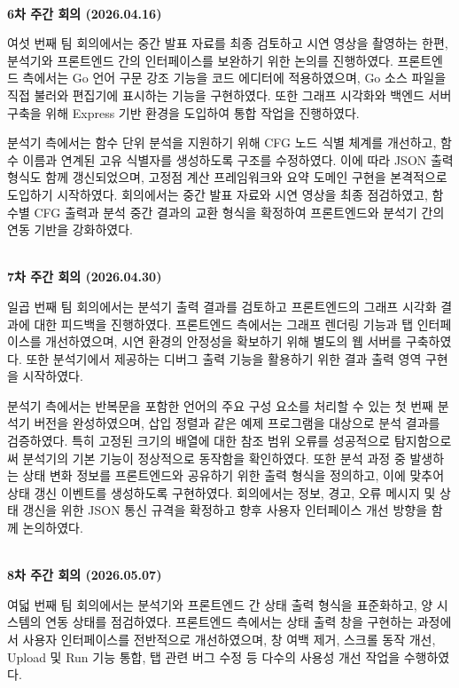\documentclass[a4paper,12pt]{article}
\begin{document}
~\\

\textbf{\large 6차 주간 회의 (2026.04.16)}

여섯 번째 팀 회의에서는 중간 발표 자료를 최종 검토하고 시연 영상을 촬영하는 한편, 분석기와 프론트엔드 간의 인터페이스를 보완하기 위한 논의를 진행하였다. 프론트엔드 측에서는 Go 언어 구문 강조 기능을 코드 에디터에 적용하였으며, Go 소스 파일을 직접 불러와 편집기에 표시하는 기능을 구현하였다. 또한 그래프 시각화와 백엔드 서버 구축을 위해 Express 기반 환경을 도입하여 통합 작업을 진행하였다.

분석기 측에서는 함수 단위 분석을 지원하기 위해 CFG 노드 식별 체계를 개선하고, 함수 이름과 연계된 고유 식별자를 생성하도록 구조를 수정하였다. 이에 따라 JSON 출력 형식도 함께 갱신되었으며, 고정점 계산 프레임워크와 요약 도메인 구현을 본격적으로 도입하기 시작하였다. 회의에서는 중간 발표 자료와 시연 영상을 최종 점검하였고, 함수별 CFG 출력과 분석 중간 결과의 교환 형식을 확정하여 프론트엔드와 분석기 간의 연동 기반을 강화하였다.

~\\

\textbf{\large 7차 주간 회의 (2026.04.30)}

일곱 번째 팀 회의에서는 분석기 출력 결과를 검토하고 프론트엔드의 그래프 시각화 결과에 대한 피드백을 진행하였다. 프론트엔드 측에서는 그래프 렌더링 기능과 탭 인터페이스를 개선하였으며, 시연 환경의 안정성을 확보하기 위해 별도의 웹 서버를 구축하였다. 또한 분석기에서 제공하는 디버그 출력 기능을 활용하기 위한 결과 출력 영역 구현을 시작하였다.

분석기 측에서는 반복문을 포함한 언어의 주요 구성 요소를 처리할 수 있는 첫 번째 분석기 버전을 완성하였으며, 삽입 정렬과 같은 예제 프로그램을 대상으로 분석 결과를 검증하였다. 특히 고정된 크기의 배열에 대한 참조 범위 오류를 성공적으로 탐지함으로써 분석기의 기본 기능이 정상적으로 동작함을 확인하였다. 또한 분석 과정 중 발생하는 상태 변화 정보를 프론트엔드와 공유하기 위한 출력 형식을 정의하고, 이에 맞추어 상태 갱신 이벤트를 생성하도록 구현하였다. 회의에서는 정보, 경고, 오류 메시지 및 상태 갱신을 위한 JSON 통신 규격을 확정하고 향후 사용자 인터페이스 개선 방향을 함께 논의하였다.

~\\

\textbf{\large 8차 주간 회의 (2026.05.07)}

여덟 번째 팀 회의에서는 분석기와 프론트엔드 간 상태 출력 형식을 표준화하고, 양 시스템의 연동 상태를 점검하였다. 프론트엔드 측에서는 상태 출력 창을 구현하는 과정에서 사용자 인터페이스를 전반적으로 개선하였으며, 창 여백 제거, 스크롤 동작 개선, Upload 및 Run 기능 통합, 탭 관련 버그 수정 등 다수의 사용성 개선 작업을 수행하였다.
\end{document}
